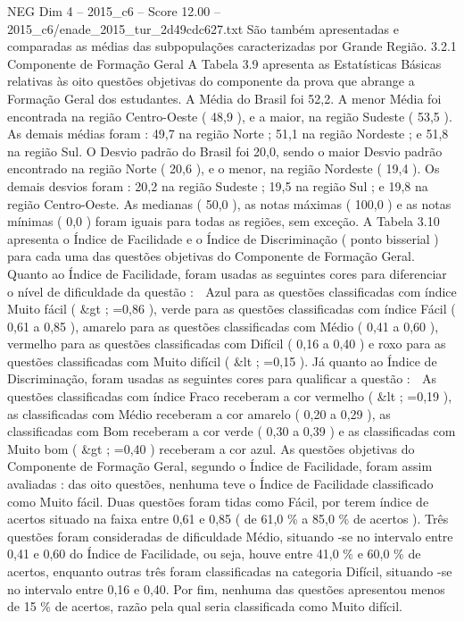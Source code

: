 \begin{textsample}{NEG Dim 4 – 2015\_c6 – Score 12.00 – 2015\_c6/enade\_2015\_tur\_2d49cdc627.txt}
São também apresentadas e comparadas as médias das subpopulações caracterizadas por Grande Região. 3.2.1 Componente de Formação Geral A Tabela 3.9 apresenta as Estatísticas Básicas relativas às oito questões objetivas do componente da prova que abrange a Formação Geral dos estudantes.
A Média do Brasil foi 52,2.
A menor Média foi encontrada na região Centro-Oeste ( 48,9 ), e a maior, na região Sudeste ( 53,5 ).
As demais médias foram : 49,7 na região Norte ; 51,1 na região Nordeste ; e 51,8 na região Sul.
O Desvio padrão do Brasil foi 20,0, sendo o maior Desvio padrão encontrado na região Norte ( 20,6 ), e o menor, na região Nordeste ( 19,4 ).
Os demais desvios foram : 20,2 na região Sudeste ; 19,5 na região Sul ; e 19,8 na região Centro-Oeste.
As medianas ( 50,0 ), as notas máximas ( 100,0 ) e as notas mínimas ( 0,0 ) foram iguais para todas as regiões, sem exceção.
A Tabela 3.10 apresenta o Índice de Facilidade e o Índice de Discriminação ( ponto bisserial ) para cada uma das questões objetivas do Componente de Formação Geral.
Quanto ao Índice de Facilidade, foram usadas as seguintes cores para diferenciar o nível de dificuldade da questão :  Azul para as questões classificadas com índice Muito fácil ( \&gt ; =0,86 ), verde para as questões classificadas com índice Fácil ( 0,61 a 0,85 ), amarelo para as questões classificadas com Médio ( 0,41 a 0,60 ), vermelho para as questões classificadas com Difícil ( 0,16 a 0,40 ) e roxo para as questões classificadas com Muito difícil ( \&lt ; =0,15 ).
Já quanto ao Índice de Discriminação, foram usadas as seguintes cores para qualificar a questão :  As questões classificadas com índice Fraco receberam a cor vermelho ( \&lt ; =0,19 ), as classificadas com Médio receberam a cor amarelo ( 0,20 a 0,29 ), as classificadas com Bom receberam a cor verde ( 0,30 a 0,39 ) e as classificadas com Muito bom ( \&gt ; =0,40 ) receberam a cor azul.
As questões objetivas do Componente de Formação Geral, segundo o Índice de Facilidade, foram assim avaliadas : das oito questões, nenhuma teve o Índice de Facilidade classificado como Muito fácil.
Duas questões foram tidas como Fácil, por terem índice de acertos situado na faixa entre 0,61 e 0,85 ( de 61,0 \% a 85,0 \% de acertos ).
Três questões foram consideradas de dificuldade Médio, situando -se no intervalo entre 0,41 e 0,60 do Índice de Facilidade, ou seja, houve entre 41,0 \% e 60,0 \% de acertos, enquanto outras três foram classificadas na categoria Difícil, situando -se no intervalo entre 0,16 e 0,40.
Por fim, nenhuma das questões apresentou menos de 15 \% de acertos, razão pela qual seria classificada como Muito difícil.

\end{textsample}
